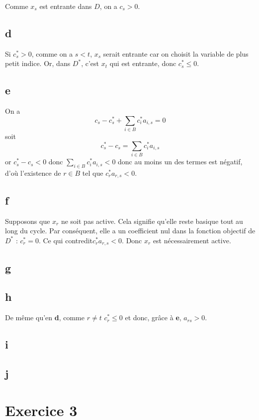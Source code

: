 Comme $x_s$ est entrante dans $D$, on a $c_s > 0$. 

\subsection*{d}

Si $c^*_s > 0$, comme on a $s<t$, $x_s$ serait entrante car on choisit la variable de plus petit indice. Or, dans $D^*$, c'est $x_t$ qui est entrante, donc $c^*_s \leqslant 0$.

\subsection*{e}

On a 
\[
    c_s - c^*_s + \sum\limits_{i\in B} c_i^*  a_{i,s} =0
\]
soit
\[
    c^*_s - c_s = \sum\limits_{i\in B} c_i^*  a_{i,s}
\]
or $c^*_s - c_s<0$ donc $\sum\limits_{i\in B} c_i^*  a_{i,s} < 0$ donc au moins un des termes est négatif, d'où l'existence de $r\in B$ tel que $c_r^*a_{r,s} < 0$.

\subsection*{f}

Supposons que $x_r$ ne soit pas active. Cela signifie qu'elle reste basique tout au long du cycle. Par conséquent, elle a un coefficient nul dans la fonction objectif de $D^*$ : $c^*_r = 0$. Ce qui contredit$c_r^*a_{r,s} < 0$. Donc $x_r$ est nécessairement active.

\subsection*{g}
\subsection*{h}

De même qu'en \textbf{d}, comme $r\neq t$ $c_r^* \leqslant 0$ et donc, grâce à \textbf{e}, $a_{rs}>0$.

\subsection*{i}
\subsection*{j}

\section*{Exercice 3}

